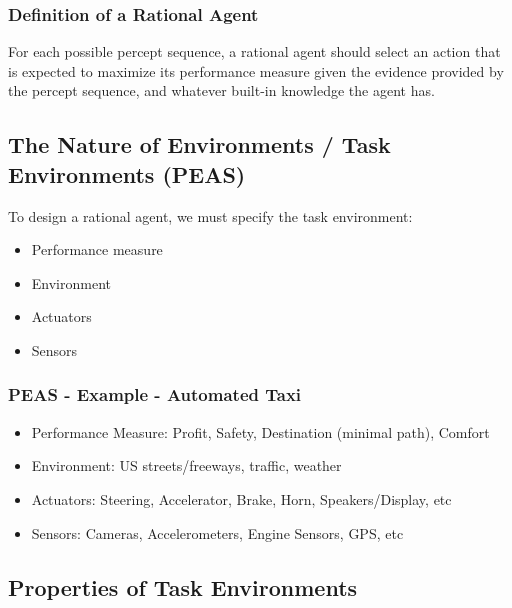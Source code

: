 \documentclass[12pt]{article}
\begin{document}
\subsubsection*{Definition of a Rational Agent}

For each possible percept sequence, a rational agent should select an action that is expected to maximize its performance
measure given the evidence provided by the percept sequence, and whatever built-in knowledge the agent has.

\subsection*{The Nature of Environments / Task Environments (PEAS)}

To design a rational agent, we must specify the task environment:
\begin{itemize}
    \item Performance measure
    \item Environment
    \item Actuators
    \item Sensors
\end{itemize}

\subsubsection*{PEAS - Example - Automated Taxi}

\begin{itemize}
    \item Performance Measure: Profit, Safety, Destination (minimal path), Comfort
    \item Environment: US streets/freeways, traffic, weather
    \item Actuators: Steering, Accelerator, Brake, Horn, Speakers/Display, etc
    \item Sensors: Cameras, Accelerometers, Engine Sensors, GPS, etc
\end{itemize}


\subsection*{Properties of Task Environments}
\end{document}
